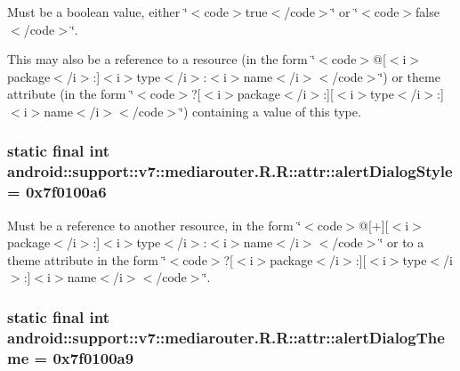 Must be a boolean value, either \char`\"{}$<$code$>$true$<$/code$>$\char`\"{} or \char`\"{}$<$code$>$false$<$/code$>$\char`\"{}. 

This may also be a reference to a resource (in the form \char`\"{}$<$code$>$@\mbox{[}$<$i$>$package$<$/i$>$:\mbox{]}$<$i$>$type$<$/i$>$:$<$i$>$name$<$/i$>$$<$/code$>$\char`\"{}) or theme attribute (in the form \char`\"{}$<$code$>$?\mbox{[}$<$i$>$package$<$/i$>$:\mbox{]}\mbox{[}$<$i$>$type$<$/i$>$:\mbox{]}$<$i$>$name$<$/i$>$$<$/code$>$\char`\"{}) containing a value of this type. \hypertarget{classandroid_1_1support_1_1v7_1_1mediarouter_1_1_r_1_1attr_ce557ee59064a5406fe2c6b2d2b22061}{
\subsubsection[{alertDialogStyle}]{\setlength{\rightskip}{0pt plus 5cm}static final int android::support::v7::mediarouter.R.R::attr::alertDialogStyle = 0x7f0100a6}}
\label{classandroid_1_1support_1_1v7_1_1mediarouter_1_1_r_1_1attr_ce557ee59064a5406fe2c6b2d2b22061}


Must be a reference to another resource, in the form \char`\"{}$<$code$>$@\mbox{[}+\mbox{]}\mbox{[}$<$i$>$package$<$/i$>$:\mbox{]}$<$i$>$type$<$/i$>$:$<$i$>$name$<$/i$>$$<$/code$>$\char`\"{} or to a theme attribute in the form \char`\"{}$<$code$>$?\mbox{[}$<$i$>$package$<$/i$>$:\mbox{]}\mbox{[}$<$i$>$type$<$/i$>$:\mbox{]}$<$i$>$name$<$/i$>$$<$/code$>$\char`\"{}. \hypertarget{classandroid_1_1support_1_1v7_1_1mediarouter_1_1_r_1_1attr_ea2e2fbfac9272b0cff7dcd563179457}{
\subsubsection[{alertDialogTheme}]{\setlength{\rightskip}{0pt plus 5cm}static final int android::support::v7::mediarouter.R.R::attr::alertDialogTheme = 0x7f0100a9}}
\label{classandroid_1_1support_1_1v7_1_1mediarouter_1_1_r_1_1attr_ea2e2fbfac9272b0cff7dcd563179457}


